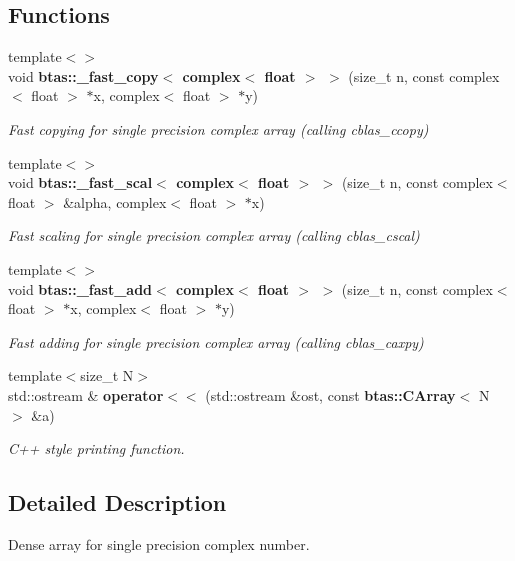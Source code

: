 \subsection*{Functions}
\begin{DoxyCompactItemize}
\item 
{\footnotesize template$<$$>$ }\\void {\bf btas\-::\-\_\-fast\-\_\-copy$<$ complex$<$ float $>$ $>$} (size\-\_\-t n, const complex$<$ float $>$ $\ast$x, complex$<$ float $>$ $\ast$y)
\begin{DoxyCompactList}\small\item\em Fast copying for single precision complex array (calling cblas\-\_\-ccopy) \end{DoxyCompactList}\item 
{\footnotesize template$<$$>$ }\\void {\bf btas\-::\-\_\-fast\-\_\-scal$<$ complex$<$ float $>$ $>$} (size\-\_\-t n, const complex$<$ float $>$ \&alpha, complex$<$ float $>$ $\ast$x)
\begin{DoxyCompactList}\small\item\em Fast scaling for single precision complex array (calling cblas\-\_\-cscal) \end{DoxyCompactList}\item 
{\footnotesize template$<$$>$ }\\void {\bf btas\-::\-\_\-fast\-\_\-add$<$ complex$<$ float $>$ $>$} (size\-\_\-t n, const complex$<$ float $>$ $\ast$x, complex$<$ float $>$ $\ast$y)
\begin{DoxyCompactList}\small\item\em Fast adding for single precision complex array (calling cblas\-\_\-caxpy) \end{DoxyCompactList}\item 
{\footnotesize template$<$size\-\_\-t N$>$ }\\std\-::ostream \& {\bf operator$<$$<$} (std\-::ostream \&ost, const {\bf btas\-::\-C\-Array}$<$ N $>$ \&a)
\begin{DoxyCompactList}\small\item\em C++ style printing function. \end{DoxyCompactList}\end{DoxyCompactItemize}


\subsection{Detailed Description}
Dense array for single precision complex number. 

